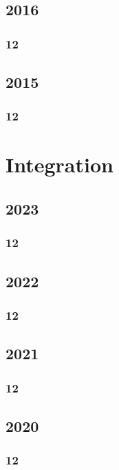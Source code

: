 \documentclass[11pt]{book}
\begin{document}
\section{2016}
\subsection{12}


\section{2015}
\subsection{12}









\chapter{Integration}
\section{2023}
\subsection{12}

\section{2022}
\subsection{12}


\section{2021}
\subsection{12}

\section{2020}
\subsection{12}

\end{document}
